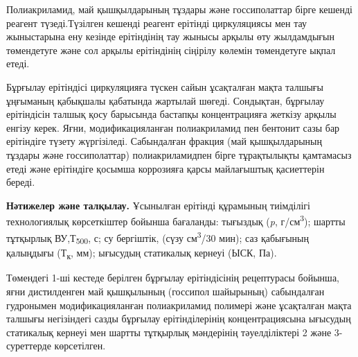 \begin{multicols}{2}
Полиакриламид, май қышқылдарының тұздары және госсиполаттар бірге
кешенді реагент түзеді.Түзілген кешенді реагент ерітінді циркуляциясы
мен тау жыныстарына ену кезінде ерітіндінің тау жынысы арқылы өту
жылдамдығын төмендетуге және сол арқылы ерітіндінің сіңірілу көлемін
төмендетуге ықпал етеді.

Бұрғылау ерітіндісі циркуляцияға түскен сайын ұсақталған мақта талшығы
ұңғыманың қабықшалы қабатында жартылай шөгеді. Сондықтан, бұрғылау
ерітіндісін талшық қосу барысында бастапқы концентрацияға жеткізу арқылы
енгізу керек. Яғни, модификацияланған полиакриламид пен бентонит сазы
бар ерітіндіге түзету жүргізіледі. Сабындалған фракция (май
қышқылдарының тұздары және госсиполаттар) полиакриламидпен бірге
тұрақтылықты қамтамасыз етеді және ерітіндіге қосымша коррозияға қарсы
майлағыштық қасиеттерін береді.

{\bfseries Нәтижелер және талқылау.} Ұсынылған ерітінді құрамының
тиімділігі технологиялық көрсеткіштер бойынша бағаланды: тығыздық
(\emph{p}, г/см\textsuperscript{3}); шартты тұтқырлық
ВУ,Т\textsubscript{500}, с; су бергіштік, (сүзу см\textsuperscript{3}/30
мин); саз қабығының қалыңдығы (Т\textsubscript{к}, мм); ығысудың
статикалық кернеуі (ЫСК, Па).

Төмендегі 1-ші кестеде берілген бұрғылау ерітіндісінің рецептурасы
бойынша, яғни дистилденген май қышқылының (госсипол шайырының)
сабындалған гудронымен модификацияланған полиакриламид полимері және
ұсақталған мақта талшығы негізіндегі сазды бұрғылау ерітінділерінің
концентрациясына ығысудың статикалық кернеуі мен шартты тұтқырлық
мәндерінің тәуелділіктері 2 және 3-суреттерде көрсетілген.
\end{multicols}
 
